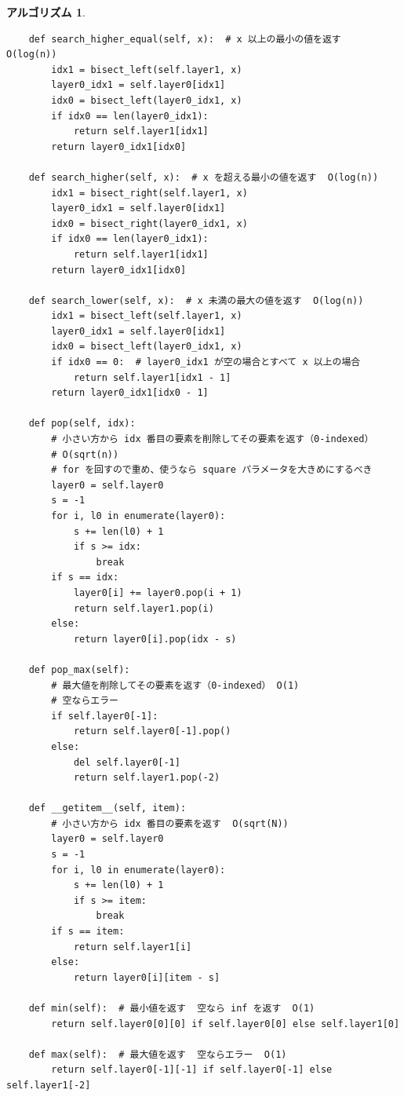 \documentclass[12pt, a4j]{ltjsarticle}
\newtheorem{alg}[thm]{アルゴリズム}
\begin{document}
\begin{alg}
\begin{lstlisting}
    def search_higher_equal(self, x):  # x 以上の最小の値を返す  O(log(n))
        idx1 = bisect_left(self.layer1, x)
        layer0_idx1 = self.layer0[idx1]
        idx0 = bisect_left(layer0_idx1, x)
        if idx0 == len(layer0_idx1):
            return self.layer1[idx1]
        return layer0_idx1[idx0]

    def search_higher(self, x):  # x を超える最小の値を返す  O(log(n))
        idx1 = bisect_right(self.layer1, x)
        layer0_idx1 = self.layer0[idx1]
        idx0 = bisect_right(layer0_idx1, x)
        if idx0 == len(layer0_idx1):
            return self.layer1[idx1]
        return layer0_idx1[idx0]

    def search_lower(self, x):  # x 未満の最大の値を返す  O(log(n))
        idx1 = bisect_left(self.layer1, x)
        layer0_idx1 = self.layer0[idx1]
        idx0 = bisect_left(layer0_idx1, x)
        if idx0 == 0:  # layer0_idx1 が空の場合とすべて x 以上の場合
            return self.layer1[idx1 - 1]
        return layer0_idx1[idx0 - 1]

    def pop(self, idx):
        # 小さい方から idx 番目の要素を削除してその要素を返す（0-indexed）
        # O(sqrt(n))
        # for を回すので重め、使うなら square パラメータを大きめにするべき
        layer0 = self.layer0
        s = -1
        for i, l0 in enumerate(layer0):
            s += len(l0) + 1
            if s >= idx:
                break
        if s == idx:
            layer0[i] += layer0.pop(i + 1)
            return self.layer1.pop(i)
        else:
            return layer0[i].pop(idx - s)

    def pop_max(self):
        # 最大値を削除してその要素を返す（0-indexed） O(1)
        # 空ならエラー
        if self.layer0[-1]:
            return self.layer0[-1].pop()
        else:
            del self.layer0[-1]
            return self.layer1.pop(-2)

    def __getitem__(self, item):
        # 小さい方から idx 番目の要素を返す  O(sqrt(N))
        layer0 = self.layer0
        s = -1
        for i, l0 in enumerate(layer0):
            s += len(l0) + 1
            if s >= item:
                break
        if s == item:
            return self.layer1[i]
        else:
            return layer0[i][item - s]

    def min(self):  # 最小値を返す  空なら inf を返す  O(1)
        return self.layer0[0][0] if self.layer0[0] else self.layer1[0]

    def max(self):  # 最大値を返す  空ならエラー  O(1)
        return self.layer0[-1][-1] if self.layer0[-1] else self.layer1[-2]


\end{lstlisting}
\end{alg}
\end{document}
